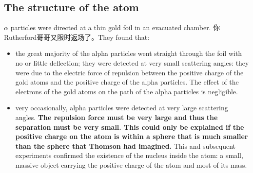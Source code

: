 \subsection{The structure of the atom}
$\alpha$ particles were directed at a thin gold foil in an evacuated chamber. 你Rutherford哥哥又限时返场了。They found that:
\begin{itemize}
  \item the great majority of the alpha particles went straight through the foil with no or little deflection; they were detected at very small scattering angles: they were due to the electric force of repulsion between the positive charge of the gold atoms and the positive charge of the alpha particles. The effect of the electrons of the gold atoms on the path of the alpha particles is negligible.
  \item very occasionally, alpha particles were detected at very large scattering angles. \textbf{The repulsion force must be very large and thus the separation must be very small. This could only be explained if the positive charge on the atom is within a sphere that is much smaller than the sphere that Thomson had imagined.} This and subsequent experiments confirmed the existence of the nucleus inside the atom: a small, massive object carrying the positive charge of the atom and most of its mass.
\end{itemize}
